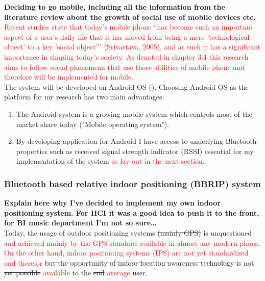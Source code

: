 \documentclass[a4paper,11pt]{article}
\begin{document}
\textbf{Deciding to go mobile, including all the information from the literature review about the growth of social use of mobile devices etc.}\\

\textcolor{red}{Recent studies state that today's mobile phone ``has become such an important aspect of a user's daily life that it has moved from being a mere 'technological object' to a key 'social object''' (Srivastava, 2005), and as such it has a significant importance in shaping today's society. As denoted in chapter 3.4 this research aims to follow social phenomena that use those abilities of mobile phone and therefore will be implemented for mobile.}\\

The system will be developed on Android OS (). Choosing Android OS as the platform for my research has two main advantages:

\begin{enumerate}

	\item The Android system is a growing mobile system which controls most of the market share today ("Mobile operating system").

	\item By developing application for Android I have access to underlying Bluetooth properties such as received signal strength indicator (RSSI) essential for my implementation of the system \textcolor{red}{as lay out in the next section}.

\end{enumerate}


\subsubsection{Bluetooth based relative indoor positioning (BBRIP) system}

\textbf{Explain here why I've decided to implement my own indoor positioning system. For HCI it was a good idea to push it to the front, for BI music department I'm not so sure\ldots{}}\\

Today, the usage of outdoor positioning systems \st{(mainly GPS)} is unquestioned \textcolor{red}{and achieved mainly by the GPS standard available in almost any modern phone}. \textcolor{red}{On the other hand, indoor positioning systems (IPS) are not yet standardized and therefor} \st{but the opportunity of indoor location awareness technology is} not \st{yet possible} \textcolor{red}{available} to the \st{end} \textcolor{red}{average} user.\\
\end{document}
